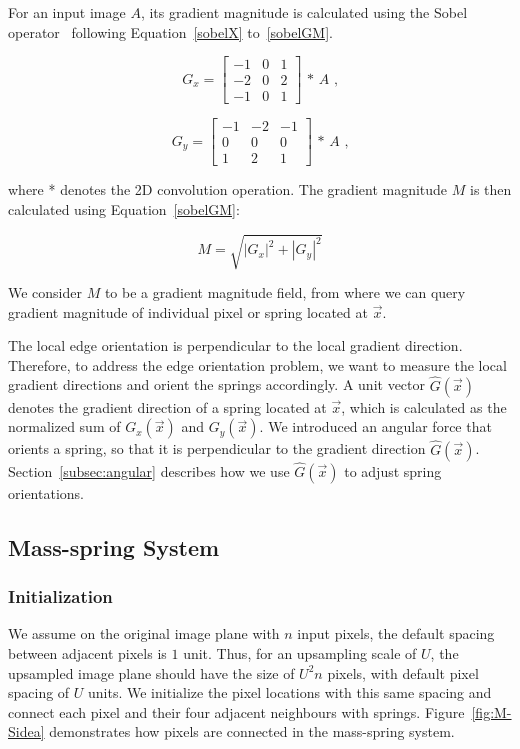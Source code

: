 For an input image $A$, its gradient magnitude is calculated using the Sobel operator~\cite[p.~271-273]{Sobel} following Equation~\eqref{sobelX} to~\eqref{sobelGM}.

\begin{equation}\label{sobelX}
G_x = \begin{bmatrix}
       -1 & 0 & 1           \\
       -2 & 0 & 2 \\
       -1 & 0 & 1    
     \end{bmatrix}  \text{ * } A \text{ ,}
\end{equation}

\begin{equation}\label{sobelY}
G_y = \begin{bmatrix}
       -1 & -2 & -1           \\
       0 & 0 & 0 \\
       1 & 2 & 1    
     \end{bmatrix}  \text{ * } A  \text{ ,}
\end{equation}

where * denotes the 2D convolution operation. The gradient magnitude $M$ is then calculated using Equation~\eqref{sobelGM}:

\begin{equation}\label{sobelGM}
M = \sqrt{|G_x|^2+|G_y|^2} 
\end{equation}


We consider $M$ to be a gradient magnitude field, from where we can query gradient magnitude of individual pixel or spring located at $\vec{x}$. 

The local edge orientation is perpendicular to the local gradient direction. Therefore, to address the edge orientation problem, we want to measure the local gradient directions and orient the springs accordingly. A unit vector $\hat{G}(\vec{x})$ denotes the gradient direction of a spring located at $\vec{x}$, which is calculated as the normalized sum of $G_x(\vec{x})$ and $G_y(\vec{x})$. We introduced an angular force that orients a spring, so that it is perpendicular to the gradient direction $\hat{G}(\vec{x})$. Section~\ref{subsec:angular} describes how we use $\hat{G}(\vec{x})$ to adjust spring orientations.


\subsection{Mass-spring System}\label{algo:massspring}
\subsubsection{Initialization}
We assume on the original image plane with $n$ input pixels, the default spacing between adjacent pixels is $1$ unit. Thus, for an upsampling scale of $U$, the upsampled image plane should have the size of $U^2n$ pixels, with default pixel spacing of $U$ units. We initialize the pixel locations with this same spacing and connect each pixel and their four adjacent neighbours with springs. Figure~\ref{fig:M-Sidea} demonstrates how pixels are connected in the mass-spring system.

